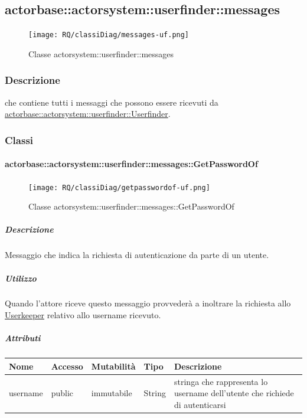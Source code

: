 \documentclass{scalatekids-article}
\begin{document}
\subsection{actorbase::actorsystem::userfinder::messages}
\label{sec:actorbase::actorsystem::userfinder::messages}

\begin{figure}[H]
  \begin{center}
    \texttt{[image: RQ/classiDiag/messages-uf.png]}
    \caption{Classe actorsystem::userfinder::messages}
  \end{center}
\end{figure}

\subsubsection{Descrizione}
 che contiene tutti i messaggi che possono essere ricevuti da
\hyperref[sec:actorbase::actorsystem::userfinder::Userfinder]{actorbase::actorsystem::userfinder::Userfinder}.

\subsubsection{Classi}

\paragraph{actorbase::actorsystem::userfinder::messages::GetPasswordOf}
\label{sec:actorbase::actorsystem::userfinder::messages::GetPasswordOf}

\begin{figure}[H]
  \begin{center}
    \texttt{[image: RQ/classiDiag/getpasswordof-uf.png]}
    \caption{Classe actorsystem::userfinder::messages::GetPasswordOf}
  \end{center}
\end{figure}

\subparagraph{Descrizione}
Messaggio che indica la richiesta di autenticazione da parte di un utente.\\

\subparagraph{Utilizzo}
Quando l'attore riceve questo messaggio provvederà a inoltrare la richiesta
allo \hyperref[sec:actorbase::actorsystem::userkeeper::Userkeeper]{Userkeeper}
relativo allo username ricevuto.

\subparagraph{Attributi}
\begin{tabular}{| p{3cm} | p{1.5cm} | p{2cm} | p{2cm} | p{8.5cm} |}
  \hline
  Nome & Accesso & Mutabilità & Tipo & Descrizione\\
  \hline
  username & public & immutabile & String & stringa che rappresenta lo username dell'utente che richiede di autenticarsi\\
  \hline
\end{tabular}
\end{document}

